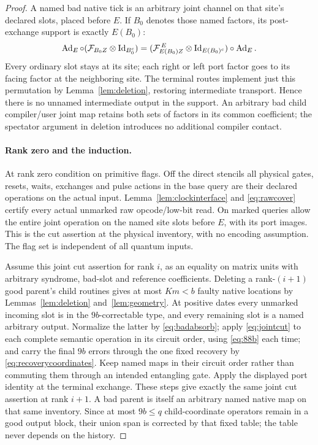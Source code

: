 \begin{proof}
A named bad native tick is an arbitrary joint channel on that site's declared slots, placed before $E$. If $B_0$ denotes those named factors, its post-exchange support is exactly $E(B_0)$:
\[
 \operatorname{Ad}_E\circ(\mathcal F_{B_0Z}\otimes\operatorname{Id}_{B_0^c})
 =
 (\mathcal F^{\,E}_{E(B_0)Z}\otimes\operatorname{Id}_{E(B_0)^c})
 \circ\operatorname{Ad}_E .
\]
Every ordinary slot stays at its site; each right or left port factor goes to its facing factor at the neighboring site. The terminal routes implement just this permutation by Lemma~\ref{lem:deletion}, restoring intermediate transport. Hence there is no unnamed intermediate output in the support. An arbitrary bad child compiler/user joint map retains both sets of factors in its common coefficient; the spectator argument in deletion introduces no additional compiler contact.

\paragraph{Rank zero and the induction.}
At rank zero condition on primitive flags. Off the direct stencils all physical gates, resets, waits, exchanges and pulse actions in the base query are their declared operations on the actual input. Lemma~\ref{lem:clockinterface} and \eqref{eq:rawcover} certify every actual unmarked raw opcode/low-bit read. On marked queries allow the entire joint operation on the named site slots before $E$, with its port images. This is the cut assertion at the physical inventory, with no encoding assumption. The flag set is independent of all quantum inputs.

Assume this joint cut assertion for rank $i$, as an equality on matrix units with arbitrary syndrome, bad-slot and reference coefficients. Deleting a rank-$(i+1)$ good parent's child routines gives at most $Km<b$ faulty native locations by Lemmas~\ref{lem:deletion} and~\ref{lem:geometry}. At positive dates every unmarked incoming slot is in the $9b$-correctable type, and every remaining slot is a named arbitrary output. Normalize the latter by \eqref{eq:badabsorb}; apply \eqref{eq:jointcut} to each complete semantic operation in its circuit order, using \eqref{eq:88b} each time; and carry the final $9b$ errors through the one fixed recovery by \eqref{eq:recoverycoordinates}. Keep named maps in their circuit order rather than commuting them through an intended entangling gate. Apply the displayed port identity at the terminal exchange. These steps give exactly the same joint cut assertion at rank $i+1$. A bad parent is itself an arbitrary named native map on that same inventory. Since at most $9b\le q$ child-coordinate operators remain in a good output block, their union span is corrected by that fixed table; the table never depends on the history.


\end{proof}
